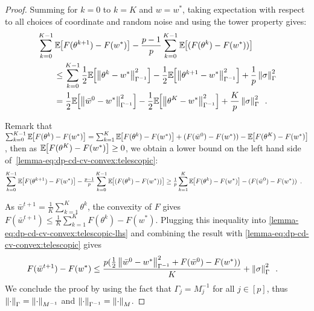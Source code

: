 \begin{proof}
  Summing  for $k = 0$ to $k = K$ and $w = w^*$,
  taking expectation with respect to all choices of coordinate and random noise
  and using the tower property gives:
  \begin{align}
     & \sum_{k=0}^{K-1} \mathbb E_{} \hspace{-0.29em} \left[ F(\theta^{k+1}) - F(w^*) \right]
    - \frac{p - 1}{p} \sum_{k=0}^{K-1} \mathbb E_{} \hspace{-0.29em} \left[ (F(\theta^k) - F(w^*)) \right] \nonumber              \\
     & \qquad \le \sum_{k=0}^{K-1} \frac{1}{2} \mathbb E_{} \hspace{-0.29em} \left[ \left \lVert \theta^k - w^* \right \rVert_{\Gamma^{-1}}^2 \right]
    - \frac{1}{2} \mathbb E_{} \hspace{-0.29em} \left[ \left \lVert \theta^{k+1} - w^* \right \rVert_{\Gamma^{-1}}^2 \right]
    + \frac{1}{p}\left \lVert \sigma \right \rVert_\Gamma^2                                                        \\
     & \qquad = \frac{1}{2} \mathbb E_{} \hspace{-0.29em} \left[ \left \lVert \bar w^0 - w^* \right \rVert_{\Gamma^{-1}}^2 \right]
    - \frac{1}{2} \mathbb E_{} \hspace{-0.29em} \left[ \left \lVert \theta^{K} - w^* \right \rVert_{\Gamma^{-1}}^2 \right]
    + \frac{K}{p}\left \lVert \sigma \right \rVert_\Gamma^2\enspace. \label{lemma-eq:dp-cd-cv-convex:telescopic}
  \end{align}

  Remark that $\sum_{k=0}^{K-1} \mathbb E_{} \hspace{-0.29em} \left[ F(\theta^k) - F(w^*) \right]
    = \sum_{k=1}^{K} \mathbb E_{} \hspace{-0.29em} \left[ F(\theta^k) - F(w^*) \right]
    + (F(\bar w^0) - F(w^*))
    - \mathbb E_{} \hspace{-0.29em} \left[ F(\theta^K) - F(w^*) \right]$,
  then as $\mathbb E_{} \hspace{-0.29em} \left[ F(\theta^K) - F(w^*) \right] \ge 0$, we obtain a lower bound on the
  left hand side of~\eqref{lemma-eq:dp-cd-cv-convex:telescopic}:
  \begin{align}
    \sum_{k=0}^{K-1} \mathbb E_{} \hspace{-0.29em} \left[ F(\theta^{k+1}) - F(w^*) \right]
    - \tfrac{p - 1}{p} \sum_{k=0}^{K-1} \mathbb E_{} \hspace{-0.29em} \left[ (F(\theta^k) - F(w^*)) \right]
     & \ge \tfrac{1}{p}\sum_{k=1}^{K} \mathbb E_{} \hspace{-0.29em} \left[ F(\theta^{k}) - F(w^*) \right]
    - (F(\bar w^0) - F(w^*))\enspace.
    \label{lemma-eq:dp-cd-cv-convex:telescopic-lhs}
  \end{align}

  As $\bar w^{t+1} = \frac{1}{K} \sum_{k=1}^K \theta^k$, the convexity of $F$
  gives $F(\bar w^{t+1}) \le \frac{1}{K} \sum_{k=1}^K  F(\theta^{k}) - F(w^*)$.
  Plugging this inequality into
  \eqref{lemma-eq:dp-cd-cv-convex:telescopic-lhs} and combining the result with
  \eqref{lemma-eq:dp-cd-cv-convex:telescopic} gives
  \begin{align}
    F(\bar w^{t+1}) - F(w^*)
     & \le \frac{p(\frac{1}{2}\left \lVert \bar w^0 - w^* \right \rVert_{\Gamma^{-1}}^2 + F(\bar w^0) - F(w^*))}{K}
    + \left \lVert \sigma \right \rVert_\Gamma^2\enspace.
  \end{align}
  We conclude the proof by using the fact that $\Gamma_j = M_j^{-1}$ for all
  $j \in [p]$,
  thus $\left \lVert \cdot \right \rVert_\Gamma = \left \lVert \cdot \right \rVert_{M^{-1}}$ and
  $\left \lVert \cdot \right \rVert_{\Gamma^{-1}} = \left \lVert \cdot \right \rVert_{M}$.
\end{proof}

